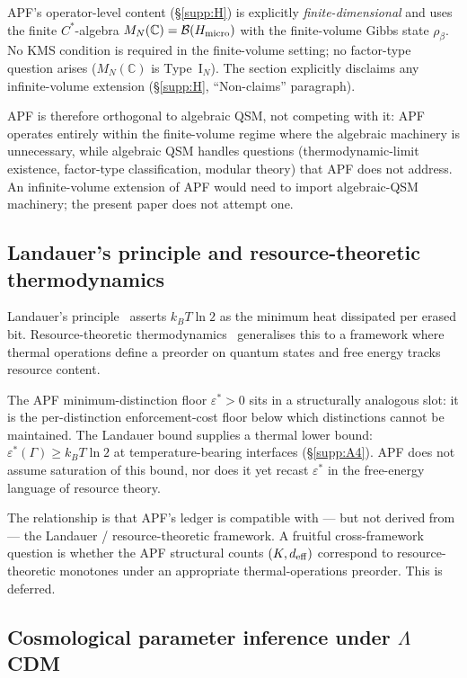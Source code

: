\documentclass[11pt]{article}
\theoremstyle{plain}
\theoremstyle{definition}
\theoremstyle{remark}
\begin{document}
APF's operator-level content (\S\ref{supp:H}) is explicitly \emph{finite-dimensional} and uses the finite $C^*$-algebra $M_N(\mathbb{C}) = \mathcal{B}(H_{\rm micro})$ with the finite-volume Gibbs state $\rho_\beta$.  No KMS condition is required in the finite-volume setting; no factor-type question arises ($M_N(\mathbb{C})$ is Type~I$_N$).  The section explicitly disclaims any infinite-volume extension (§\ref{supp:H}, ``Non-claims'' paragraph).

APF is therefore orthogonal to algebraic QSM, not competing with it: APF operates entirely within the finite-volume regime where the algebraic machinery is unnecessary, while algebraic QSM handles questions (thermodynamic-limit existence, factor-type classification, modular theory) that APF does not address.  An infinite-volume extension of APF would need to import algebraic-QSM machinery; the present paper does not attempt one.

\bigskip

\subsection{Landauer's principle and resource-theoretic thermodynamics}\label{supp:N4}

Landauer's principle~\cite{Landauer1961} asserts $k_B T \ln 2$ as the minimum heat dissipated per erased bit.  Resource-theoretic thermodynamics~\cite{BrandaoHorodecki2013} generalises this to a framework where thermal operations define a preorder on quantum states and free energy tracks resource content.

The APF minimum-distinction floor $\varepsilon^* > 0$ sits in a structurally analogous slot: it is the per-distinction enforcement-cost floor below which distinctions cannot be maintained.  The Landauer bound supplies a thermal lower bound: $\varepsilon^*(\Gamma) \geq k_B T \ln 2$ at temperature-bearing interfaces (\S\ref{supp:A4}).  APF does not assume saturation of this bound, nor does it yet recast $\varepsilon^*$ in the free-energy language of resource theory.

The relationship is that APF's ledger is compatible with --- but not derived from --- the Landauer / resource-theoretic framework.  A fruitful cross-framework question is whether the APF structural counts $(K, d_{\rm eff})$ correspond to resource-theoretic monotones under an appropriate thermal-operations preorder.  This is deferred.

\bigskip

\subsection{Cosmological parameter inference under $\Lambda$CDM}\label{supp:N5}
\end{document}
